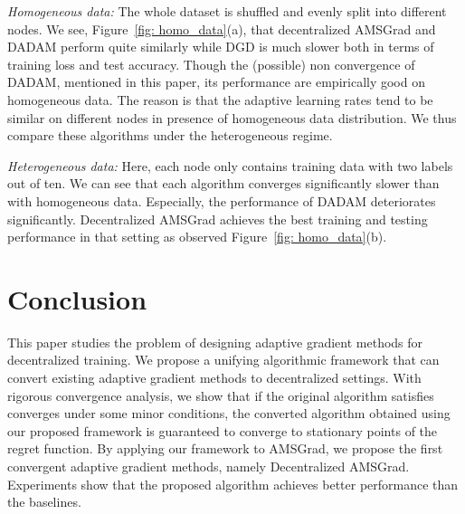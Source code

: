 \documentclass{article} %
\begin{document}
\textit{Homogeneous data:}
The whole dataset is shuffled and evenly split into different nodes. 
We see, Figure~\ref{fig: homo_data}(a), that decentralized AMSGrad and DADAM perform quite similarly while DGD is much slower both in terms of training loss and test accuracy. 
Though the (possible) non convergence of DADAM, mentioned in this paper, its performance are empirically good on homogeneous data. 
The reason is that the adaptive learning rates tend to be similar on different nodes in presence of homogeneous data distribution. 
We thus compare these algorithms under the heterogeneous regime. 

\textit{Heterogeneous data:}
Here, each node only contains training data with two labels out of ten. 
We can see that each algorithm converges significantly slower than with homogeneous data. 
Especially, the performance of DADAM deteriorates significantly. 
Decentralized AMSGrad achieves the best training and testing performance in that setting as observed Figure~\ref{fig: homo_data}(b).


\vspace{-0.05in}
\section{Conclusion}\label{sec:conclusion}
\vspace{-0.05in}

This paper studies the problem of designing adaptive gradient methods for decentralized training. We propose a unifying algorithmic framework that can convert existing adaptive gradient methods to decentralized settings. 
With rigorous convergence analysis, we show that if the original algorithm satisfies converges under some minor conditions, the converted algorithm obtained using our proposed framework is guaranteed to converge to stationary points of the regret function. 
By applying our framework to AMSGrad, we propose the first convergent adaptive gradient methods, namely Decentralized AMSGrad. 
Experiments show that the proposed algorithm achieves better performance than the baselines. 



\end{document}
